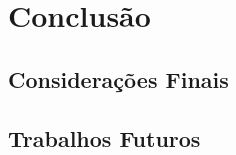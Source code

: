 \chapter{Conclusão}
\label{sec-conclusoes}




\section{Considerações Finais}
\label{sec-conclusoes-consideracoes}



\section{Trabalhos Futuros}
\label{sec-conclusoes-trabalhosfuturos}

